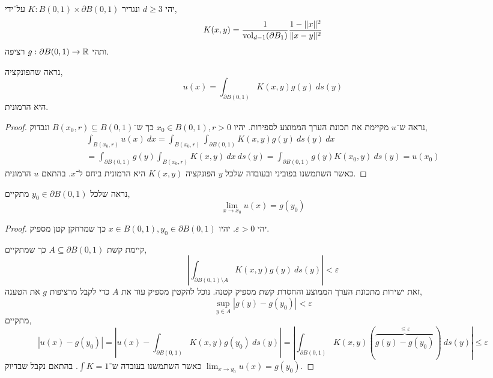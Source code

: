 \question{}
יהי $d \ge 3$ ונגדיר $K : B(0, 1) \times \partial B(0, 1)$ על־ידי,
\[
	K(x, y)
	= \frac{1}{\operatorname{vol}_{d - 1}(\partial B_1)}  \frac{1 - \lVert x \rVert^2}{\lVert x - y \rVert^2}
\]
ותהי $g : \partial B(0, 1) \to \mathbb{R}$ רציפה.

\subquestion{}
נראה שהפונקציה,
\[
	u(x)
	= \int_{\partial B(0, 1)} K(x, y) g(y)\ ds(y)
\]
היא הרמונית.
\begin{proof}
	נראה ש־$u$ מקיימת את תכונת הערך הממוצע לספירות.
	יהיו $x_0 \in B(0, 1), r > 0$ כך ש־$B(x_0, r) \subseteq B(0, 1)$ ונבדוק,
	\begin{multline*}
		\int_{B(x_0, r)} u(x)\ dx
		= \int_{B(x_0, r)} \int_{\partial B(0, 1)} K(x, y) g(y)\ ds(y)\ dx \\
		= \int_{\partial B(0, 1)} g(y) \int_{B(x_0, r)} K(x, y)\ dx\ ds(y)
		= \int_{\partial B(0, 1)} g(y) K(x_0, y)\ ds(y)
		= u(x_0)
	\end{multline*}
	כאשר השתמשנו בפוביני ובעובדה שלכל $y$ הפונקציה $K(x, y)$ היא הרמונית ביחס ל־$x$.
	בהתאם $u$ הרמונית.
\end{proof}

\subquestion{}
נראה שלכל $y_0 \in \partial B(0, 1)$ מתקיים,
\[
	\lim_{x \to x_0} u(x)
	= g(y_0)
\]
\begin{proof}
	יהי $\varepsilon > 0$.
	יהיו $x \in B(0, 1), y_0 \in \partial B(0, 1)$ כך שמרחקן קטן מספיק.
	
	קיימת קשת $A \subseteq \partial B(0, 1)$ כך שמתקיים,
	\[
		\left\lvert \int_{\partial B(0, 1) \setminus A} K(x, y) g(y)\ ds(y) \right\rvert
		< \varepsilon
	\]
	זאת ישירות מתכונת הערך הממוצע והחסרת קשת מספיק קטנה.
	נוכל להקטין מספיק עוד את $A$ כדי לקבל מרציפות $g$ את הטענה,
	\[
		\sup_{y \in A} |g(y) - g(y_0)|
		< \varepsilon
	\]
	מתקיים,
	\[
		|u(x) - g(y_0)|
		= \left\lvert u(x) - \int_{\partial B(0, 1)} K(x, y) g(y_0)\ ds(y) \right\rvert
		=
		\left\lvert \int_{\partial B(0, 1)} K(x, y) (\overbrace{g(y) - g(y_0)}^{\le \varepsilon})\ ds(y) \right\rvert
		\le \varepsilon
	\]
	כאשר השתמשנו בעובדה ש־$\int K = 1$.
	בהתאם נקבל שבדיוק $\lim_{x \to y_0} u(x) = g(y_0)$.
\end{proof}


